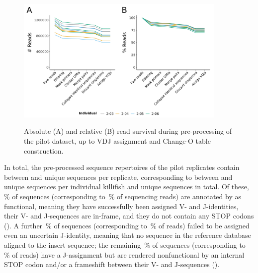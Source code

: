 \begin{figure}
\centering
\includegraphics[width = 0.9\textwidth]{_Figures/png/pilot-read-survival-init.png}
\begin{subfigure}{0em}
\label{fig:igseq-pilot-read-survival-init-a}
\end{subfigure}
\begin{subfigure}{0em}
\label{fig:igseq-pilot-read-survival-init-b}
\end{subfigure}
\caption{Absolute (A) and relative (B) read survival during pre-processing of the pilot \igseq dataset, up to VDJ assignment and Change-O table construction.}
\label{fig:igseq-pilot-read-survival-init}
\end{figure}

In total, the pre-processed sequence repertoires of the pilot replicates contain between  and  unique sequences per replicate, corresponding to between  and  unique sequences per individual killifish and  unique sequences in total. Of these, \,\% of sequences (corresponding to \,\% of sequencing reads) are annotated by  as functional, meaning they have successfully been assigned V- and J-identities, their V- and J-sequences are in-frame, and they do not contain any STOP codons (). A further \,\% of sequences (corresponding to \,\% of reads) failed to be assigned even an uncertain J-identity, meaning that no \jh sequence in the reference database aligned to the insert sequence; the remaining \,\% of sequences (corresponding to \,\% of reads) have a J-assignment but are rendered nonfunctional by an internal STOP codon and/or a frameshift between their V- and J-sequences ().

